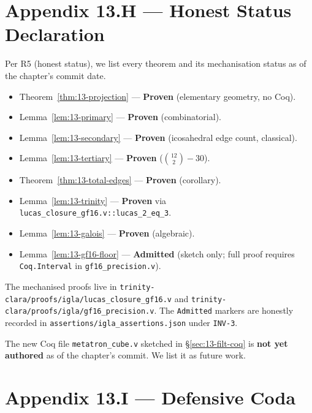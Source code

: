 \section*{Appendix 13.H --- Honest Status Declaration}
\label{sec:13-appH}

Per R5 (honest status), we list every theorem and its mechanisation
status as of the chapter's commit date.

\begin{itemize}
\item Theorem~\ref{thm:13-projection} --- \textbf{Proven}
  (elementary geometry, no Coq).
\item Lemma~\ref{lem:13-primary} --- \textbf{Proven} (combinatorial).
\item Lemma~\ref{lem:13-secondary} --- \textbf{Proven} (icosahedral
  edge count, classical).
\item Lemma~\ref{lem:13-tertiary} --- \textbf{Proven}
  ($\binom{12}{2} - 30$).
\item Theorem~\ref{thm:13-total-edges} --- \textbf{Proven}
  (corollary).
\item Lemma~\ref{lem:13-trinity} --- \textbf{Proven} via
  \verb|lucas_closure_gf16.v::lucas_2_eq_3|.
\item Lemma~\ref{lem:13-galois} --- \textbf{Proven} (algebraic).
\item Lemma~\ref{lem:13-gf16-floor} --- \textbf{Admitted} (sketch
  only; full proof requires \verb|Coq.Interval| in
  \verb|gf16_precision.v|).
\end{itemize}


The mechanised proofs live in
\verb|trinity-clara/proofs/igla/lucas_closure_gf16.v| and
\verb|trinity-clara/proofs/igla/gf16_precision.v|. The
\verb|Admitted| markers are honestly recorded in
\verb|assertions/igla_assertions.json| under \texttt{INV-3}.

The new Coq file \verb|metatron_cube.v| sketched in
\S\ref{sec:13-filt-coq} is \textbf{not yet authored} as of the
chapter's commit. We list it as future work.


\section*{Appendix 13.I --- Defensive Coda}
\label{sec:13-appI}

